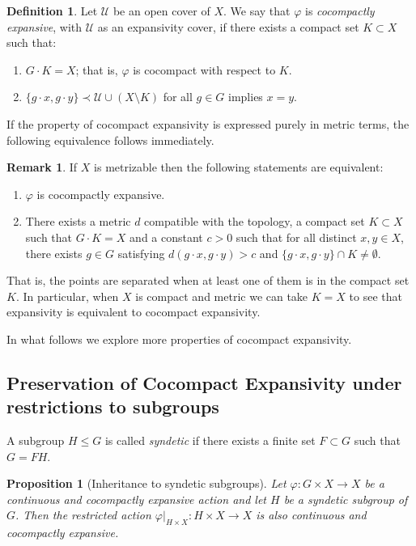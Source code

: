 \documentclass[12pt]{amsart}
\theoremstyle{plain}
\newtheorem{proposition}[theorem]{Proposition}
\theoremstyle{definition}
\newtheorem{definition}[theorem]{Definition}
\newtheorem{remark}[theorem]{Remark}
\theoremstyle{remark}
\begin{document}
\begin{definition}\label{cocompactExP}
Let \(\mathcal{U}\)
be an open cover of \(X\). We say that \(\varphi\) is \emph{cocompactly expansive}, with \(\mathcal{U}\) as an expansivity cover,
if there exists a compact set \(K \subset X\) such that:
\begin{enumerate}
\item \(G \cdot K = X\); that is, \(\varphi\) is cocompact with respect to \(K\).
\item \(\{ g \cdot x, g \cdot y \} \prec \mathcal{U} \cup (X \setminus K)\) for all \(g \in G\) implies \(x = y\).
\end{enumerate}
\end{definition}

If the property of cocompact expansivity is expressed purely in metric terms, the following equivalence follows immediately.

\begin{remark}
If \(X\) is metrizable then the following statements are equivalent:
\begin{enumerate}
\item \(\varphi\) is cocompactly expansive.
\item There exists a metric \(d\) compatible with the topology, a compact set \(K \subset X\) such that \(G \cdot K = X\) and a constant \(c > 0\) such that for all distinct \(x, y \in X\), there exists \(g \in G\) satisfying \(d(g \cdot x, g \cdot y) > c\) and \(\{ g \cdot x, g \cdot y \} \cap K \neq \emptyset\).
\end{enumerate}
That is, the points are separated when at least one of them is in the compact set $K$.
In particular, when $X$ is compact and metric we can take $K=X$ to see that expansivity is equivalent to cocompact expansivity.
\end{remark}

In what follows we explore more properties of cocompact expansivity.

\subsection{Preservation of Cocompact Expansivity under restrictions to subgroups}\label{preserv_op_MIE}

A subgroup \( H \le G \) is called \emph{syndetic} if there exists a finite set \( F \subset G \) such that \( G = F H \).

\begin{proposition}[Inheritance to syndetic subgroups] \label{th:herencia}
Let \( \varphi : G \times X \to X \) be a continuous and cocompactly expansive action and let \( H \) be a syndetic subgroup of \( G \). Then the restricted action \( \varphi|_{H \times X} : H \times X \to X \) is also continuous and cocompactly expansive.
\end{proposition}
\end{document}
